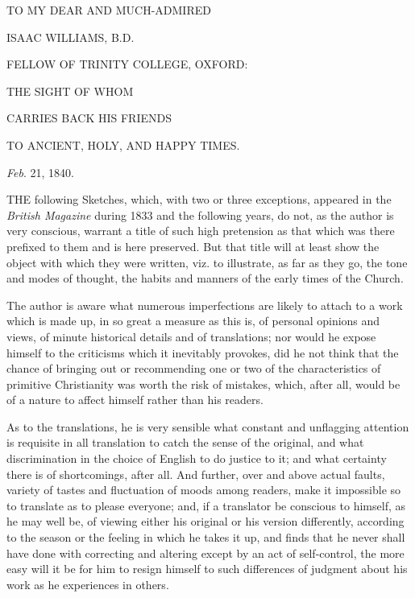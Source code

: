 



TO MY DEAR AND MUCH-ADMIRED


ISAAC WILLIAMS, B.D.


FELLOW OF TRINITY COLLEGE, OXFORD:


THE SIGHT OF WHOM


CARRIES BACK HIS FRIENDS


TO ANCIENT, HOLY, AND HAPPY TIMES.


\emph{Feb}. 21, 1840.


THE following Sketches, which, with two
or three exceptions, appeared in the \emph{British Magazine} during
1833 and the following years, do not, as the author is very conscious,
warrant a title of such high pretension as that which was there
prefixed to them and is here preserved. But that title will at least
show the object with which they were written, viz. to illustrate, as
far as they go, the tone and modes of thought, the habits and manners
of the early times of the Church.

The author is aware what numerous imperfections are likely to
attach to a work which is made up, in so great a measure as this is,
of personal opinions and views, of minute historical details and of
translations; nor would he expose himself to the criticisms which it
inevitably provokes, did he not think that the chance of bringing out
or recommending one or two of the characteristics of primitive
Christianity was worth the risk of mistakes, which, after all, would
be of a nature to affect himself rather than his readers.

As to the translations, he is very sensible what constant and
unflagging attention is requisite in all translation to catch the
sense of the original, and what discrimination in the choice of
English to do justice to it; and what certainty there is of
shortcomings, after all. And further, over and above actual faults,
variety of tastes and fluctuation of moods among readers, make it
impossible so to translate as to please everyone; and, if a translator
be conscious to himself, as he may well be, of viewing either his
original or his version differently, according to the season or the
feeling in which he takes it up, and finds that he never shall have
done with correcting and altering except by an act of self-control,
the more easy will it be for him to resign himself to such differences
of judgment about his work as he experiences in others.

